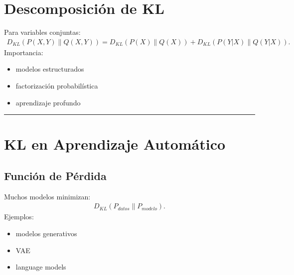 \documentclass[letterpaper,10pt,english]{jupyterBook}
\begin{document}
\section{Descomposición de KL}
\label{\detokenize{02_mathematical_foundations/kl_divergence:descomposicion-de-kl}}
\sphinxAtStartPar
Para variables conjuntas:
\begin{equation*}
\begin{split}
D_{KL}(P(X,Y)\|Q(X,Y))
=
D_{KL}(P(X)\|Q(X))
+
D_{KL}(P(Y|X)\|Q(Y|X)).
\end{split}
\end{equation*}
\sphinxAtStartPar
Importancia:
\begin{itemize}
\item {} 
\sphinxAtStartPar
modelos estructurados

\item {} 
\sphinxAtStartPar
factorización probabilística

\item {} 
\sphinxAtStartPar
aprendizaje profundo

\end{itemize}


\bigskip\hrule\bigskip



\section{KL en Aprendizaje Automático}
\label{\detokenize{02_mathematical_foundations/kl_divergence:kl-en-aprendizaje-automatico}}

\subsection{Función de Pérdida}
\label{\detokenize{02_mathematical_foundations/kl_divergence:funcion-de-perdida}}
\sphinxAtStartPar
Muchos modelos minimizan:
\begin{equation*}
\begin{split}
D_{KL}(P_{datos}\|P_{modelo}).
\end{split}
\end{equation*}
\sphinxAtStartPar
Ejemplos:
\begin{itemize}
\item {} 
\sphinxAtStartPar
modelos generativos

\item {} 
\sphinxAtStartPar
VAE

\item {} 
\sphinxAtStartPar
language models

\end{itemize}
\end{document}
